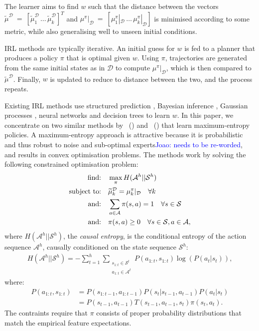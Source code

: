 \documentclass[letterpaper]{article}
\newcommand{\citet}[1]{\citeauthor{#1}~(\citeyear{#1})}
\newcommand{\jm}[1]{\textcolor{blue}{Joao: #1}}
\newcommand{\jm}[1]{}
\begin{document}
The learner aims to find $w$ such that the distance between the vectors $\widetilde\mu^{\mathcal{D}}~=~[\widetilde\mu^{\mathcal{D}}_1\,\ldots\,\widetilde\mu^{\mathcal{D}}_k]^T$ and $\mu^{\pi}|_{\mathcal{D}}~=~[\mu^{\pi}_1|_{\mathcal{D}}\,\ldots\,\mu^{\pi}_k|_{\mathcal{D}}]$ is minimised according to some metric, while also generalising well to unseen initial conditions.

IRL methods are typically iterative. An initial guess for $w$ is fed to a planner that produces a policy $\pi$ that is optimal given $w$.  Using $\pi$, trajectories are generated from the same initial states as in $\mathcal{D}$ to compute $\mu^{\pi}|_{\mathcal{D}}$, which is then compared to $\widetilde{\mu}^{\mathcal{D}}$.  Finally, $w$ is updated to reduce to distance between the two, and the process repeats.

Existing IRL methods use structured prediction \cite{ratliff2006maximum}, Bayesian inference \cite{ramachandran2007bayesian}, Gaussian processes \cite{levine2011nonlinear}, neural networks and decision trees \cite{ratliff2007boosting} to learn $w$.  In this paper, we concentrate on two similar methods by \citet{ziebart2008maximum} and \citet{ziebart2010modelingthesis} that learn maximum-entropy policies.  A maximum-entropy approach is attractive because it is probabilistic and thus robust to noise and sub-optimal experts\jm{needs to be re-worded}, and results in convex optimisation problems. The methods work by solving the following constrained optimisation problem:
\begin{align}
	\hbox{find:} &\quad\max\limits_{\pi} H(\mathcal{A}^h||\mathcal{S}^h)\label{eq:primal_obj}\\
\hbox{subject to:}&\quad\widetilde{\mu}^{\mathcal{D}}_k   = \mu^{\pi}_k|_{\mathcal{D}}\quad\forall k \label{eq:features_equality_constraint}\\
\hbox{and:} &\quad\sum_{a\in\mathcal{A}}\pi(s,a)  = 1\quad\forall s\in\mathcal{S}\\
\hbox{and:} &\quad\pi(s,a) \geq 0\quad\forall s\in\mathcal{S},a\in\mathcal{A},\label{eq:positive_policy}
\end{align}
where $H(\mathcal{A}^h||\mathcal{S}^h)$, the \emph{causal entropy}, is the conditional entropy of the action sequence $\mathcal{A}^h$, causally conditioned on the state sequence $\mathcal{S}^h$:
\begin{align}
H(\mathcal{A}^h||\mathcal{S}^h) = -\sum_{t=1}^h \sum_{\substack{s_{1:t}\in\mathcal{S}^t\\a_{1:t}\in\mathcal{A}^t}} P(a_{1:t},s_{1:t})\log(P(a_t|s_t)),
\label{eg:entdef}
\end{align}
where:
\begin{align*}
  P(a_{1:t},s_{1:t})&= P(s_{1:t-1},a_{1:t-1})P(s_t|s_{t-1},a_{t-1})P(a_t|s_t)\\
  &=P(s_{t-1},a_{t-1})T(s_{t-1},a_{t-1},s_t)\pi(s_t,a_t).
\end{align*}
The contraints require that $\pi$ consists of proper probability distributions that match the empirical feature expectations.
\end{document}
